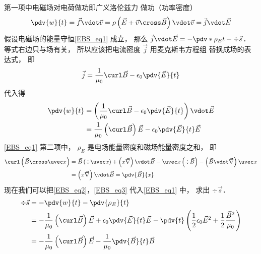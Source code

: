 第一项中电磁场对电荷做功即广义洛伦兹力%
做功（功率密度）
\begin{equation}
\pdv{w}{t} = \vec f \vdot \vec v = \rho \left( {\vec E + \vec v \cross \vec B} \right) \vdot \vec v = \vec j \vdot \vec E
\end{equation} 
假设电磁场的能量守恒\autoref{EBS_eq1} 成立， 那么 $\vec j \vdot \vec E =  - \pdv*{\rho_E}{t} - \div \vec s$． 等式右边只与场有关， 所以应该把电流密度 $\vec j$ 用麦克斯韦方程组%
替换成场的表达式， 即
\begin{equation}
\vec j = \frac{1}{{{\mu _0}}}\curl \vec B - {\epsilon _0} \pdv{\vec E}{t}
\end{equation} 
代入得
\begin{equation}\label{EBS_eq2}
\begin{aligned}
\pdv{w}{t} &= \left( {\frac{1}{{{\mu _0}}}\curl \vec B - {\epsilon _0} \pdv{\vec E}{t}} \right) \vdot \vec E\\
&= \frac{1}{{{\mu _0}}}\left( {\curl \vec B} \right)\vec E - {\epsilon _0} \pdv{\vec E}{t} \vec E
\end{aligned}
\end{equation} 
\autoref{EBS_eq1} 第二项中， ${\rho _E}$ 是电场能量密度和磁场能量密度之和， 即
\begin{equation}\label{EBS_eq3}
\begin{aligned}
\curl \left( {\vec B \cross \uvec x} \right) &= \vec B\left( {\div \uvec x} \right) + \left( {x\vec\nabla } \right)\vdot\vec B - \uvec x\left( {\div \vec B} \right) - \left( {\vec B\vdot\vec\nabla } \right)\uvec x \\
&= \left( {x\vec\nabla } \right)\vdot\vec B = \pdv{\vec B}{x}
\end{aligned}\end{equation} 
现在我们可以把\autoref{EBS_eq2}，\autoref{EBS_eq3} 代入\autoref{EBS_eq1} 中， 求出 $\div \vec s$． 
\begin{equation}
\begin{aligned}
\div \vec s &=  - \pdv{w}{t} - \pdv{\rho_E}{t}\\
&=  - \frac{1}{{{\mu _0}}}\left( {\curl \vec B} \right)\vec E + {\epsilon _0} \pdv{\vec E}{t} \vec E - \pdv{t} \left( {\frac{1}{2}{\epsilon _0}{{\vec E}^2} + \frac{1}{2}\frac{{{{\vec B}^2}}}{{{\mu _0}}}} \right)\\
&=  - \frac{1}{{{\mu _0}}}\left( {\curl \vec B} \right)\vec E - \frac{1}{{{\mu _0}}} \pdv{\vec B}{t}\vec B
\end{aligned}
\end{equation} 
